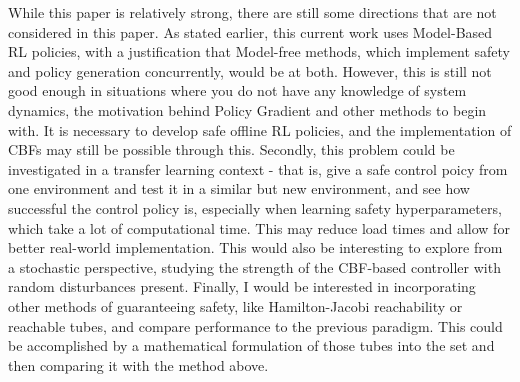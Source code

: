 \documentclass[10pt, oneside]{article}
\newenvironment{problem}[2][Problem]{\begin{trivlist}
    \item[\hskip \labelsep {\bfseries #1}\hskip \labelsep {\bfseries #2.}]}{\end{trivlist}}
\begin{document}
\begin{problem}{$\#7$}
While this paper is relatively strong, there are still some directions that are not considered in this paper. As stated earlier, this current work uses Model-Based RL policies, with a justification that Model-free methods, which implement safety and policy generation concurrently, would be at both. However, this is still not good enough in situations where you do not have any knowledge of system dynamics, the motivation behind Policy Gradient and other methods to begin with. It is necessary to develop safe offline RL policies, and the implementation of CBFs may still be possible through this. Secondly, this problem could be investigated in a transfer learning context - that is, give a safe control poicy from one environment and test it in a similar but new environment, and see how successful the control policy is, especially when learning safety hyperparameters, which take a lot of computational time. This may reduce load times and allow for better real-world implementation. This would also be interesting to explore from a stochastic perspective, studying the strength of the CBF-based controller with random disturbances present. Finally, I would be interested in incorporating other methods of guaranteeing safety, like Hamilton-Jacobi reachability or reachable tubes, and compare performance to the previous paradigm. This could be accomplished by a mathematical formulation of those tubes into the set and then comparing it with the method above.  
\end{problem}


\newpage


\end{document}
